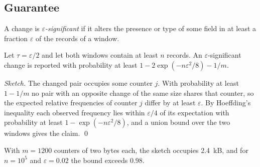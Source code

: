 \subsection{Guarantee}
A change is \emph{$\varepsilon$-significant} if it alters the presence or type of some field in at least a fraction $\varepsilon$ of the records of a window.

\begin{theorem}\label{thm:bound}
Let $\tau = \varepsilon / 2$ and let both windows contain at least $n$ records. An $\varepsilon$-significant change is reported with probability at least $1 - 2\exp(-n \varepsilon^2 / 8) - 1/m$.
\end{theorem}

\begin{proof}[Sketch]
The changed pair occupies some counter $j$. With probability at least $1 - 1/m$ no pair with an opposite change of the same size shares that counter, so the expected relative frequencies of counter $j$ differ by at least $\varepsilon$. By Hoeffding's inequality each observed frequency lies within $\varepsilon / 4$ of its expectation with probability at least $1 - \exp(-n \varepsilon^2 / 8)$, and a union bound over the two windows gives the claim. \qed
\end{proof}

With $m = 1200$ counters of two bytes each, the sketch occupies 2.4~kB, and for $n = 10^5$ and $\varepsilon = 0.02$ the bound exceeds 0.98.
